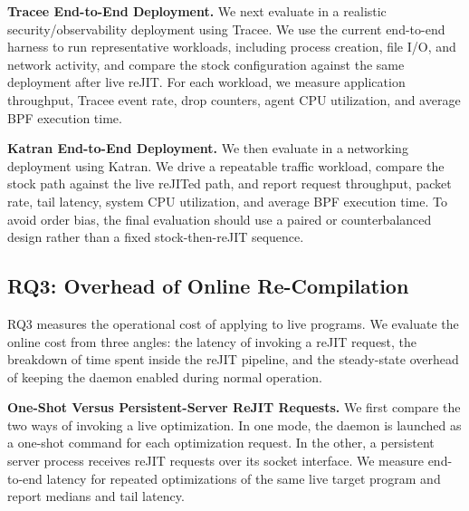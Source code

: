 \noindent\textbf{Tracee End-to-End Deployment.}
We next evaluate \tool in a realistic security/observability deployment using Tracee. We use the current end-to-end harness to run representative workloads, including process creation, file I/O, and network activity, and compare the stock configuration against the same deployment after live reJIT. For each workload, we measure application throughput, Tracee event rate, drop counters, agent CPU utilization, and average BPF execution time.


\noindent\textbf{Katran End-to-End Deployment.}
We then evaluate \tool in a networking deployment using Katran. We drive a repeatable traffic workload, compare the stock path against the live reJITed path, and report request throughput, packet rate, tail latency, system CPU utilization, and average BPF execution time. To avoid order bias, the final evaluation should use a paired or counterbalanced design rather than a fixed stock-then-reJIT sequence.


\subsection{RQ3: Overhead of Online Re-Compilation}
\label{subsec:rq3}

RQ3 measures the operational cost of applying \tool to live programs. We evaluate the online cost from three angles: the latency of invoking a reJIT request, the breakdown of time spent inside the reJIT pipeline, and the steady-state overhead of keeping the daemon enabled during normal operation.

\noindent\textbf{One-Shot Versus Persistent-Server ReJIT Requests.}
We first compare the two ways of invoking a live optimization. In one mode, the daemon is launched as a one-shot command for each optimization request. In the other, a persistent server process receives reJIT requests over its socket interface. We measure end-to-end latency for repeated optimizations of the same live target program and report medians and tail latency.

